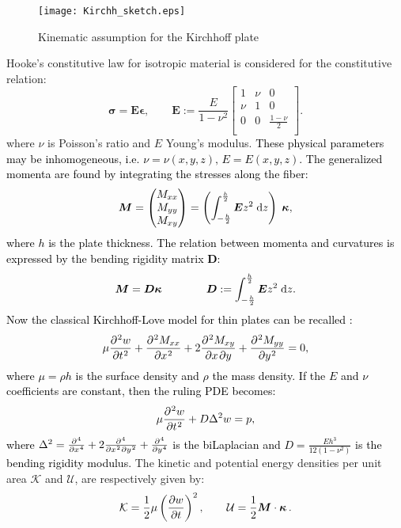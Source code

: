 \documentclass[11pt]{article}
\newcommand{\revOne}[1]{\textcolor{black}{#1}}
\begin{document}
	\begin{figure}[tb]
		\centering
		\texttt{[image: Kirchh\_sketch.eps]}
		\caption{Kinematic assumption for the Kirchhoff plate}
		\label{fig:Kirchh_sketch}
	\end{figure}
	
	Hooke's constitutive law for isotropic material is considered for the constitutive relation:
	\begin{equation}
	\bm{\sigma} = 
	\bm{E} \bm{\epsilon} , \qquad \bm{E} :=
	\frac{E}{1 - \nu^2}
	\begin{bmatrix}
	1 & \nu & 0 \\
	\nu & 1 & 0 \\
	0  &  0 & \frac{1-\nu}{2}\\
	\end{bmatrix}.
	\end{equation}
	where $\nu$ is Poisson's ratio and $E$ Young's modulus. \revOne{These physical parameters may be inhomogeneous, i.e. $\nu = \nu(x, y, z), \, E = E(x, y, z)$. The generalized momenta are found by integrating the stresses along the fiber:
		\begin{equation*}
		\bm{M} =
		\begin{pmatrix}
		M_{xx} \\
		M_{yy} \\
		M_{xy} \\
		\end{pmatrix} = \left(\int_{-\frac{h}{2} }^{\frac{h}{2}} \bm{E} z^2 \d{z} \right) \; \bm{\kappa},
		\end{equation*}
		where $h$ is the plate thickness. The relation between momenta and curvatures is expressed by the bending rigidity matrix $\bm{D}$:
		\begin{equation}
		\label{eq:BenRigVec}
		\bm{M} = \bm{D} \bm{\kappa} \qquad  \qquad  \bm{D} := \int_{-\frac{h}{2} }^{\frac{h}{2}} \bm{E} z^2 \d{z}.
		\end{equation}
		Now the classical Kirchhoff-Love model for thin plates can be recalled \cite{timoshenko1959theory}:
		\begin{equation}
		\label{eq:KirchhClass}
		\mu \diffp[2]{w}{t}  + \diffp[2]{M_{xx}}{x} + 2 \diffp{M_{xy}}{x,y} + \diffp[2]{M_{yy}}{y}= 0,
		\end{equation}
		where $\mu = \rho h$ is the surface density and $\rho$ the mass density. If the $E$ and $\nu$ coefficients are constant, then the ruling PDE becomes:
		\begin{equation}
		\mu \diffp[2]{w}{t}  + D \Delta^2 w= p ,
		\end{equation}
		where $\Delta^2 = \diffp[4]{}{x} + 2 \diffp[2,2]{}{x,y} + \diffp[4]{}{y}$ is the biLaplacian and $D = \frac{E h^3}{12 (1 - \nu^2)}$ is the bending rigidity modulus.
	}
	The kinetic and potential energy densities per unit area $\mathcal{K}$ and $\mathcal{U}$, are respectively given by:
	\begin{equation*}
	\mathcal{K} = \frac{1}{2} \mu \left(\diffp{w}{t}\right)^2, \qquad 
	\mathcal{U} = \frac{1}{2} \bm{M} \cdot \bm{\kappa} \, .	
	\end{equation*} 
	
\end{document}

